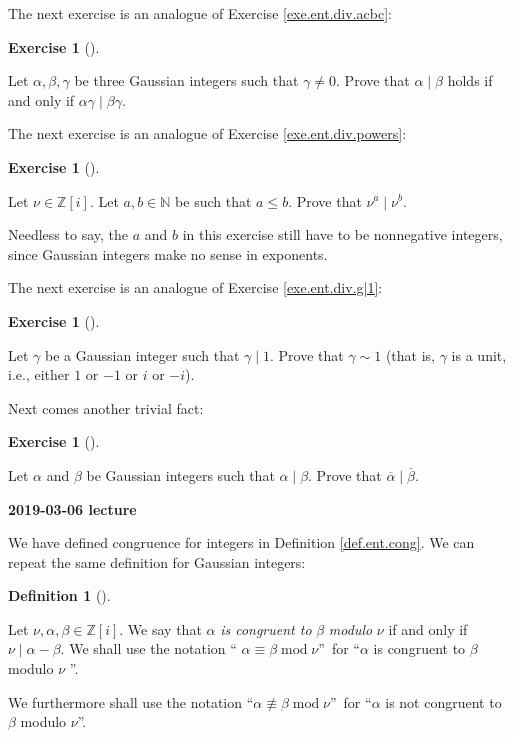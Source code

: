 \documentclass[numbers=enddot,12pt,final,onecolumn,notitlepage]{scrartcl}%
\newcounter{exer}
\numberwithin{exer}{subsection}
\theoremstyle{definition}
\newtheorem{defi}[theo]{Definition}
\newenvironment{definition}[1][]
{\begin{defi}[#1]\begin{leftbar}}
{\end{leftbar}\end{defi}}
\newtheorem{exmp}[exer]{Exercise}
\newenvironment{exercise}[1][]
{\begin{exmp}[#1]\begin{leftbar}}
{\end{leftbar}\end{exmp}}
\begin{document}
The next exercise is an analogue of Exercise \ref{exe.ent.div.acbc}:

\begin{exercise}
\label{exe.Z[i].div.acbc}Let $\alpha,\beta,\gamma$ be three Gaussian integers
such that $\gamma\neq0$. Prove that $\alpha\mid\beta$ holds if and only if
$\alpha\gamma\mid\beta\gamma$.
\end{exercise}

The next exercise is an analogue of Exercise \ref{exe.ent.div.powers}:

\begin{exercise}
\label{exe.Z[i].div.powers}Let $\nu\in\mathbb{Z}\left[  i\right]  $. Let
$a,b\in\mathbb{N}$ be such that $a\leq b$. Prove that $\nu^{a}\mid\nu^{b}$.
\end{exercise}

Needless to say, the $a$ and $b$ in this exercise still have to be nonnegative
integers, since Gaussian integers make no sense in exponents.

The next exercise is an analogue of Exercise \ref{exe.ent.div.g|1}:

\begin{exercise}
\label{exe.Z[i].div.g|1}Let $\gamma$ be a Gaussian integer such that
$\gamma\mid1$. Prove that $\gamma\sim1$ (that is, $\gamma$ is a unit, i.e.,
either $1$ or $-1$ or $i$ or $-i$).
\end{exercise}

Next comes another trivial fact:

\begin{exercise}
\label{exe.Z[i].div.conj}Let $\alpha$ and $\beta$ be Gaussian integers such
that $\alpha\mid\beta$. Prove that $\overline{\alpha}\mid\overline{\beta}$.
\end{exercise}

\begin{center}
\textbf{2019-03-06 lecture}
\end{center}

We have defined congruence for integers in Definition \ref{def.ent.cong}. We
can repeat the same definition for Gaussian integers:

\begin{definition}
\label{def.Z[i].cong}Let $\nu,\alpha,\beta\in\mathbb{Z}\left[  i\right]  $. We
say that $\alpha$ \textit{is congruent to }$\beta$ \textit{modulo }$\nu$ if
and only if $\nu\mid\alpha-\beta$. We shall use the notation \textquotedblleft%
$\alpha\equiv\beta\operatorname{mod}\nu$\textquotedblright\ for
\textquotedblleft$\alpha$ is congruent to $\beta$ modulo $\nu$%
\textquotedblright.

We furthermore shall use the notation \textquotedblleft$\alpha\not \equiv
\beta\operatorname{mod}\nu$\textquotedblright\ for \textquotedblleft$\alpha$
is not congruent to $\beta$ modulo $\nu$\textquotedblright.
\end{definition}
\end{document}
